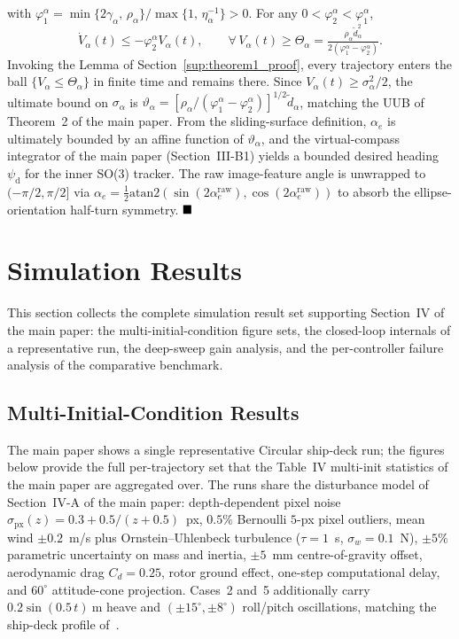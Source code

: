 \documentclass[10pt,journal]{IEEEtran}
\begin{document}
with $\varphi_1^\alpha = \min\{2\gamma_\alpha,\,\rho_\alpha\}/\max\{1,\,\eta_\alpha^{-1}\} > 0$. For any $0<\varphi_2^\alpha<\varphi_1^\alpha$,
\begin{equation*}
\dot{V}_\alpha(t)\le -\varphi_2^\alpha V_\alpha(t),\qquad \forall\,V_\alpha(t)\ge\Theta_\alpha = \tfrac{\rho_\alpha\tilde{d}_\alpha^2}{2(\varphi_1^\alpha-\varphi_2^\alpha)}.
\end{equation*}
Invoking the Lemma of Section~\ref{sup:theorem1_proof}, every trajectory enters the ball $\{V_\alpha\le\Theta_\alpha\}$ in finite time and remains there. Since $V_\alpha(t)\ge\sigma_\alpha^2/2$, the ultimate bound on $\sigma_\alpha$ is $\vartheta_\alpha = [\rho_\alpha/(\varphi_1^\alpha-\varphi_2^\alpha)]^{1/2}\tilde{d}_\alpha$, matching the UUB of Theorem~2 of the main paper. From the sliding-surface definition, $\alpha_e$ is ultimately bounded by an affine function of $\vartheta_\alpha$, and the virtual-compass integrator of the main paper (Section~III-B1) yields a bounded desired heading $\psi_\text{d}$ for the inner SO(3) tracker. The raw image-feature angle is unwrapped to $(-\pi/2,\pi/2]$ via $\alpha_e = \tfrac12\text{atan2}(\sin(2\alpha_e^\text{raw}),\cos(2\alpha_e^\text{raw}))$ to absorb the ellipse-orientation half-turn symmetry. $\hfill\blacksquare$

\clearpage
\section{Simulation Results}
\label{sec:sup-results}
This section collects the complete simulation result set supporting Section~IV of the main paper: the multi-initial-condition figure sets, the closed-loop internals of a representative run, the deep-sweep gain analysis, and the per-controller failure analysis of the comparative benchmark.

\subsection{Multi-Initial-Condition Results}
\label{sec:sup-multi-init}

The main paper shows a single representative Circular ship-deck run; the figures below provide the full per-trajectory set that the Table~IV multi-init statistics of the main paper are aggregated over. The runs share the disturbance model of Section~IV-A of the main paper: depth-dependent pixel noise $\sigma_{\text{px}}(z)=0.3+0.5/(z+0.5)$~px, $0.5\%$ Bernoulli $5$-px pixel outliers, mean wind $\pm 0.2$~m/s plus Ornstein--Uhlenbeck turbulence ($\tau=1$~s, $\sigma_w=0.1$~N), $\pm 5\%$ parametric uncertainty on mass and inertia, $\pm 5$~mm centre-of-gravity offset, aerodynamic drag $C_d=0.25$, rotor ground effect, one-step computational delay, and $60^\circ$ attitude-cone projection. Cases~2 and~5 additionally carry $0.2\sin(0.5\,t)~\text{m}$ heave and $(\pm 15^\circ,\pm 8^\circ)$ roll/pitch oscillations, matching the ship-deck profile of~\cite{lin2022}.
\end{document}
